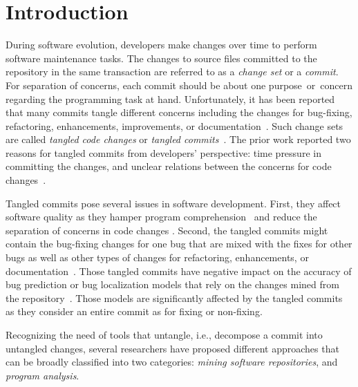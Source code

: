 \section{Introduction}
\label{intro:sec}

During software evolution, developers make changes over time
to perform software maintenance tasks. 
The changes to source files committed to the repository in the same transaction are referred to as a {\em change set} or a {\em commit}. 
For separation of concerns, each commit should be about one
purpose~or~concern regarding the programming task at hand.
Unfortunately, it has been reported that many commits tangle different  concerns including the changes for bug-fixing, refactoring,
enhancements, improvements, or
documentation~\cite{tao-fse12,kim-emse16,kim-msr13,hill-tse12,nguyen-issre13}.
Such change sets are called {\em tangled code changes} or {\em tangled
  commits}~\cite{kim-emse16,kim-msr13}. The prior work reported two
reasons for tangled commits from developers' perspective: time
pressure in committing the changes, and unclear relations between the
concerns for code changes~\cite{flexeme-fse20}.

Tangled commits pose several issues in software development. First,
they affect software quality as they hamper program
comprehension~\cite{tao-fse12} and reduce the separation of concerns
in code changes \cite{flexeme-fse20}. Second, the tangled commits
might contain the bug-fixing changes for one bug that are mixed with
the fixes for other bugs as well as other types of changes for
refactoring, enhancements, or
documentation~\cite{kim-emse16,kim-msr13,nguyen-issre13}. Those
tangled commits have negative impact on the accuracy of bug
prediction or bug localization models that rely on the changes mined from
the repository~\cite{kim-emse16,kim-msr13}. 
Those models are significantly affected by the tangled commits as they consider an entire commit as for fixing or non-fixing. 



Recognizing the need of tools that untangle, i.e., decompose a
commit into untangled changes, several researchers have proposed different approaches that can be broadly classified into two
categories: {\em mining software repositories}, and {\em program
  analysis}.

